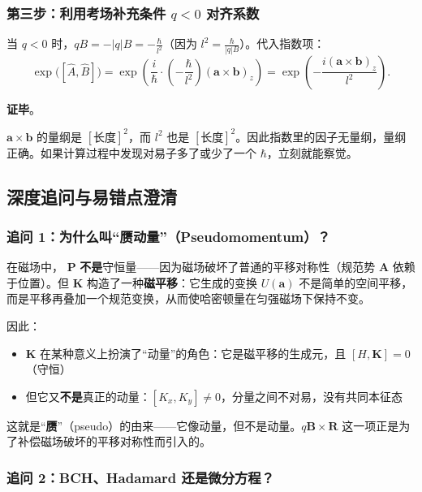 \subsubsection{第三步：利用考场补充条件 $q < 0$ 对齐系数}

当 $q < 0$ 时，$qB = -|q|B = -\frac{\hbar}{l^2}$（因为 $l^2 = \frac{\hbar}{|q|B}$）。代入指数项：
\[
\exp\bigl([\hat{A}, \hat{B}]\bigr) = \exp\left( \frac{i}{\hbar} \cdot \left(-\frac{\hbar}{l^2}\right) (\bm{a} \times \bm{b})_z \right) = \exp\left( -\frac{i(\bm{a} \times \bm{b})_z}{l^2} \right).
\]

\textbf{证毕}。

\begin{tipbox}[量纲快速检查]
$\bm{a} \times \bm{b}$ 的量纲是 $[\text{长度}]^2$，而 $l^2$ 也是 $[\text{长度}]^2$。因此指数里的因子无量纲，量纲正确。如果计算过程中发现对易子多了或少了一个 $\hbar$，立刻就能察觉。
\end{tipbox}

\subsection{深度追问与易错点澄清}

\subsubsection*{追问 1：为什么叫``赝动量''（Pseudomomentum）？}

在磁场中， $\bm{P}$ \textbf{不是}守恒量——因为磁场破坏了普通的平移对称性（规范势 $\bm{A}$ 依赖于位置）。但 $\bm{K}$ 构造了一种\textbf{磁平移}：它生成的变换 $U(\bm{a})$ 不是简单的空间平移，而是平移再叠加一个规范变换，从而使哈密顿量在匀强磁场下保持不变。

因此：
\begin{itemize}[nosep]
    \item $\bm{K}$ 在某种意义上扮演了``动量''的角色：它是磁平移的生成元，且 $[H, \bm{K}] = 0$（守恒）
    \item 但它又\textbf{不是}真正的动量：$[K_x, K_y] \neq 0$，分量之间不对易，没有共同本征态
\end{itemize}

这就是``\textbf{赝}''（pseudo）的由来——它像动量，但不是动量。$q\bm{B} \times \bm{R}$ 这一项正是为了补偿磁场破坏的平移对称性而引入的。

\subsubsection*{追问 2：BCH、Hadamard 还是微分方程？}

